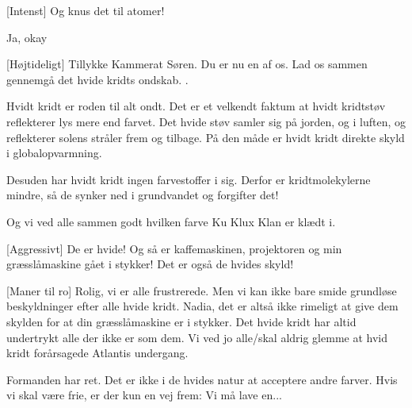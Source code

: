 \documentclass[a4paper,11pt]{article}
\begin{document}
\begin{sketch}
[Intenst] Og knus det til atomer! 

 Ja, okay 

[Højtideligt] Tillykke Kammerat Søren. Du er nu en af os. %
Lad os sammen gennemgå det hvide kridts ondskab. .

 Hvidt kridt er roden til alt ondt.  Det er et velkendt faktum at hvidt kridtstøv reflekterer lys mere end farvet. Det hvide støv samler sig på jorden, og i luften, og reflekterer solens stråler frem og tilbage. På den måde er hvidt kridt direkte skyld i globalopvarmning.

 Desuden har hvidt kridt ingen farvestoffer i sig. Derfor er kridtmolekylerne mindre, så de synker ned i grundvandet og forgifter det!


 Og vi ved alle sammen godt hvilken farve Ku Klux Klan er klædt i.

[Aggressivt] De er hvide! Og så er kaffemaskinen, projektoren og min græsslåmaskine gået i stykker! Det er også de hvides skyld!

[Maner til ro] Rolig, vi er alle frustrerede. Men vi kan ikke bare smide grundløse beskyldninger efter alle hvide kridt.  Nadia, det er altså ikke rimeligt at give dem skylden for at din græsslåmaskine er i stykker.  
Det hvide kridt har altid undertrykt alle der ikke er som dem. Vi ved jo alle/skal aldrig glemme at hvid kridt forårsagede Atlantis undergang.







 Formanden har ret. %
Det er ikke i de hvides natur at acceptere andre farver. Hvis vi skal være frie, er der kun en vej frem: Vi må lave en...


\end{sketch}
\end{document}
